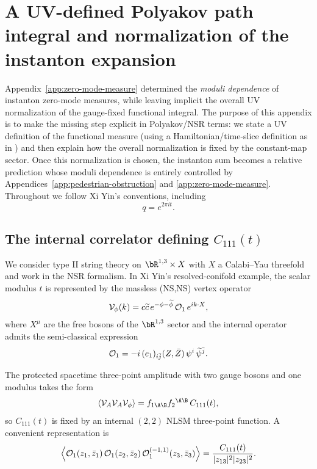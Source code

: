 \documentclass[12pt]{article}
\newcommand{\wt}{\widetilde}
\begin{document}
\section{A UV-defined Polyakov path integral and normalization of the instanton expansion}
\label{app:uv-measure}

Appendix~\ref{app:zero-mode-measure} determined the \emph{moduli dependence} of
instanton zero-mode measures, while leaving implicit the overall UV
normalization of the gauge-fixed functional integral. The purpose of this
appendix is to make the missing step explicit in Polyakov/NSR terms: we state a
UV definition of the functional measure (using a Hamiltonian/time-slice
definition as in \cite[App.~B]{Yin:FoundationsStringTheory}) and then explain
how the overall normalization is fixed by the constant-map sector. Once this
normalization is chosen, the instanton sum becomes a relative prediction whose
moduli dependence is entirely controlled by Appendices~\ref{app:pedestrian-obstruction}
and \ref{app:zero-mode-measure}. Throughout we follow Xi Yin's conventions,
including
\begin{equation}
  q=e^{2\pi i t}.
  \label{eq:uv-q-def}
\end{equation}

\subsection{The internal correlator defining \texorpdfstring{$C_{111}(t)$}{C111(t)}}
We consider type II string theory on $\bR^{1,3}\times X$ with $X$ a
Calabi--Yau threefold and work in the NSR formalism. In Xi Yin's
resolved-conifold example, the scalar modulus $t$ is represented by the
massless (NS,NS) vertex operator \cite[Eq.~(19.175)]{Yin:FoundationsStringTheory}
\begin{equation}
  {\cal V}_\phi(k)=c\wt c\,e^{-\phi-\wt\phi}\,{\cal O}_1\,e^{ik\cdot X},
  \label{eq:uv-vphi}
\end{equation}
where $X^\mu$ are the free bosons of the $\bR^{1,3}$ sector and the internal
operator admits the semi-classical expression \cite[Eq.~(19.176)]{Yin:FoundationsStringTheory}
\begin{equation}
  {\cal O}_1 = -i\,(e_1)_{i\bar j}(Z,\bar Z)\,\psi^i\,\wt\psi^{\bar j}.
  \label{eq:uv-o1}
\end{equation}

The protected spacetime three-point amplitude with two gauge bosons and one
modulus takes the form \cite[Eq.~(19.178)]{Yin:FoundationsStringTheory}
\begin{equation}
  \langle {\cal V}_A{\cal V}_A{\cal V}_\phi\rangle
  = f_{1\A\B}f_2{}^{\A\B}\,C_{111}(t),
  \label{eq:uv-vaa-vphi}
\end{equation}
so $C_{111}(t)$ is fixed by an internal $(2,2)$ NLSM three-point function. A
convenient representation is \cite[Eq.~(19.180)]{Yin:FoundationsStringTheory}
\begin{equation}
  \left\langle {\cal O}_1(z_1,\bar z_1)\,{\cal O}_1(z_2,\bar z_2)\,{\cal O}_1^{(-1,1)}(z_3,\bar z_3)\right\rangle
  = \frac{C_{111}(t)}{|z_{13}|^2|z_{23}|^2}.
  \label{eq:yin-ccc-nsns}
\end{equation}
\end{document}
